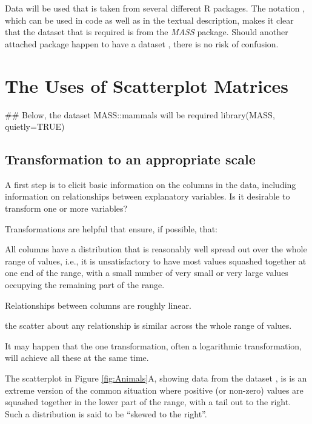 Data will be used that is taken from several different R packages.
The notation , which can be used in code as well
as in the textual description, makes it clear that the dataset
 that is required is from the {\em MASS} package.
Should another attached package happen to have a dataset
, there is no risk of confusion.

\section{The Uses of Scatterplot Matrices}

\begin{Schunk}
\begin{Sinput}
## Below, the dataset MASS::mammals will be required
library(MASS, quietly=TRUE)
\end{Sinput}
\end{Schunk}

\subsection{Transformation to an appropriate scale}

A first step is to elicit basic information on the columns in the
data, including information on relationships between explanatory
variables.  Is it desirable to transform one or more variables?

Transformations are helpful that ensure, if possible, that:
\begin{itemizz}
\item All columns have a distribution that is reasonably well spread
  out over the whole range of values, i.e., it is unsatisfactory to
  have most values squashed together at one end of the range, with a
  small number of very small or very large values occupying the
  remaining part of the range.
  \item Relationships between columns are roughly linear.
  \item the scatter about any relationship is similar across the whole
range of values.
\end{itemizz}
It may happen that the one transformation, often a logarithmic
transformation, will achieve all these at the same time.

The scatterplot in Figure \ref{fig:Animals}A, showing data from the
dataset , is is an extreme version of the
common situation where positive (or non-zero) values are squashed
together in the lower part of the range, with a tail out to the right.
Such a distribution is said to be ``skewed to the right''.

